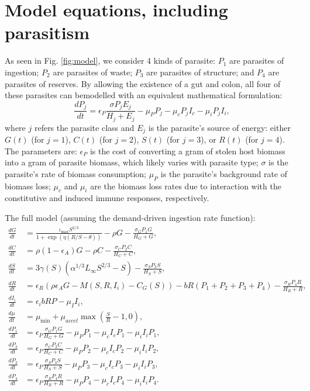 \documentclass[12pt,reqno,final,pdftex]{amsart}\usepackage[]{graphicx}\usepackage[]{color}
\theoremstyle{plain}
\numberwithin{equation}{part}
\begin{document}
\section*{Model equations, including parasitism}
As seen in Fig. \ref{fig:model}, we consider 4 kinds of parasite: $P_1$ are parasites of ingestion; $P_2$ are parasites of waste; $P_3$ are parasites of structure; and $P_4$ are parasites of reserves.
By allowing the existence of a gut and colon, all four of these parasites can bemodelled with an equivalent mathematical formulation:
\begin{equation}
\frac{dP_j}{dt} = \epsilon_P \frac{\sigma P_j E_j}{H_j+E_j}  - \mu_P P_j - \mu_c P_j I_c - \mu_i P_j I_i,
\end{equation}
where $j$ refers the parasite class and $E_j$ is the parasite's source of energy: either $G(t)$ (for $j=1$), $C(t)$ (for $j=2$), $S(t)$ (for $j=3$), or $R(t)$ (for $j=4$).
The parameters are: $\epsilon_P$ is the cost of converting a gram of stolen host biomass into a gram of parasite biomass, which likely varies with parasite type; $\sigma$ is the parasite's rate of biomass consumption; $\mu_P$ is the parasite's background rate of biomass loss; $\mu_c$ and $\mu_i$ are the biomass loss rates due to interaction with the constitutive and induced immune responses, respectively.

The full model (assuming the demand-driven ingestion rate function):
\begin{align}
\frac{dG}{dt} &= \frac{\iota_{\max}S^{2/3}}{1 + \exp\left(\eta(R/S-\theta)\right)} - \rho G - \frac{\sigma_G P_1 G}{H_G + G}, \\
\frac{dC}{dt} &= \rho (1-\epsilon_A)G - \rho C - \frac{\sigma_C P_2 C}{H_C + C}, \\
\frac{dS}{dt} &= 3\gamma(S) \left(\alpha^{1/3}L_{\infty }S^{2/3}-S\right) - \frac{\sigma_S P_3 S}{H_S + S}, \\
\frac{dR}{dt} &= \epsilon_R\left(\rho \epsilon_A G-M(S,R,I_i)-C_G(S)\right)-b R (P_1+P_2+P_3+P_4) - \frac{\sigma_R P_4 R}{H_R + R}, \\
\frac{dI_i}{dt} &= \epsilon_ib R P-\mu_II_i, \\
\frac{d\mu}{dt} &= \mu_{\min} + \mu_{accel}\max\left(\frac{S}{R} - 1, 0\right), \\
\frac{dP_1}{dt} &= \epsilon_P \frac{\sigma_G P_1 G}{H_G + G} - \mu_P P_1 - \mu_c I_c P_1 - \mu_i I_i P_1, \\
\frac{dP_2}{dt} &= \epsilon_P \frac{\sigma_C P_2 C}{H_C + C} - \mu_P P_2 - \mu_c I_c P_2 - \mu_i I_i P_2, \\
\frac{dP_3}{dt} &= \epsilon_P \frac{\sigma_S P_3 S}{H_S + S} - \mu_P P_3 - \mu_c I_c P_3 - \mu_i I_i P_3, \\
\frac{dP_4}{dt} &= \epsilon_P \frac{\sigma_R P_4 R}{H_R + R} - \mu_P P_4 - \mu_c I_c P_4 - \mu_i I_i P_4.
\end{align}
\end{document}
